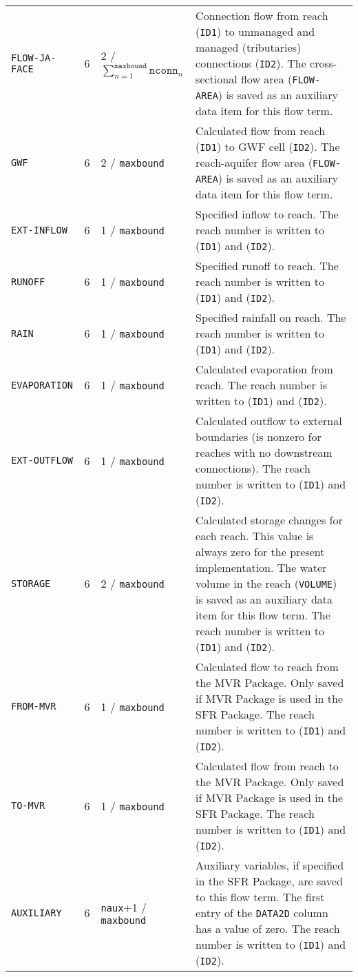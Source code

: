 \begin{longtable}{p{3.5cm} p{2cm} p{3.5cm} p{6.5cm}}
\texttt{FLOW-JA-FACE} & 6 & 2 / $\sum_{n=1}^{\texttt{maxbound}} \texttt{nconn}_n$  & Connection flow from reach (\texttt{ID1}) to unmanaged and managed (tributaries) connections (\texttt{ID2}). The cross-sectional flow area (\texttt{FLOW-AREA}) is saved as an auxiliary data item for this flow term. \\
\texttt{GWF} & 6 & 2 / \texttt{maxbound} & Calculated flow from reach (\texttt{ID1}) to GWF cell (\texttt{ID2}). The reach-aquifer flow area (\texttt{FLOW-AREA}) is saved as an auxiliary data item for this flow term.\\
\texttt{EXT-INFLOW} & 6 & 1 / \texttt{maxbound} & Specified inflow to reach. The reach number is written to (\texttt{ID1}) and (\texttt{ID2}). \\
\texttt{RUNOFF} & 6 & 1 / \texttt{maxbound} & Specified runoff to reach. The reach number is written to (\texttt{ID1}) and (\texttt{ID2}). \\
\texttt{RAIN} & 6 & 1 / \texttt{maxbound} & Specified rainfall on reach. The reach number is written to (\texttt{ID1}) and (\texttt{ID2}). \\
\texttt{EVAPORATION} & 6 & 1 / \texttt{maxbound} & Calculated evaporation from reach. The reach number is written to (\texttt{ID1}) and (\texttt{ID2}). \\
\texttt{EXT-OUTFLOW} & 6 & 1 / \texttt{maxbound} & Calculated outflow to external boundaries (is nonzero for reaches with no downstream connections). The reach number is written to (\texttt{ID1}) and (\texttt{ID2}). \\
\texttt{STORAGE} & 6 & 2 / \texttt{maxbound} & Calculated storage changes for each reach.  This value is always zero for the present implementation.  The water volume in the reach (\texttt{VOLUME}) is saved as an auxiliary data item for this flow term.  The reach number is written to (\texttt{ID1}) and (\texttt{ID2}). \\
\texttt{FROM-MVR} & 6 & 1 / \texttt{maxbound} & Calculated flow to reach from the MVR Package. Only saved if MVR Package is used in the SFR Package. The reach number is written to (\texttt{ID1}) and (\texttt{ID2}). \\
\texttt{TO-MVR} & 6 & 1 / \texttt{maxbound} & Calculated flow from reach to the MVR Package. Only saved if MVR Package is used in the SFR Package. The reach number is written to (\texttt{ID1}) and (\texttt{ID2}). \\
\texttt{AUXILIARY} & 6 & \texttt{naux}+1 / \texttt{maxbound} & Auxiliary variables, if specified in the SFR Package, are saved to this flow term. The first entry of the \texttt{DATA2D} column has a value of zero.  The reach number is written to (\texttt{ID1}) and (\texttt{ID2}). 
\label{table:binarysfr}
\end{longtable}


